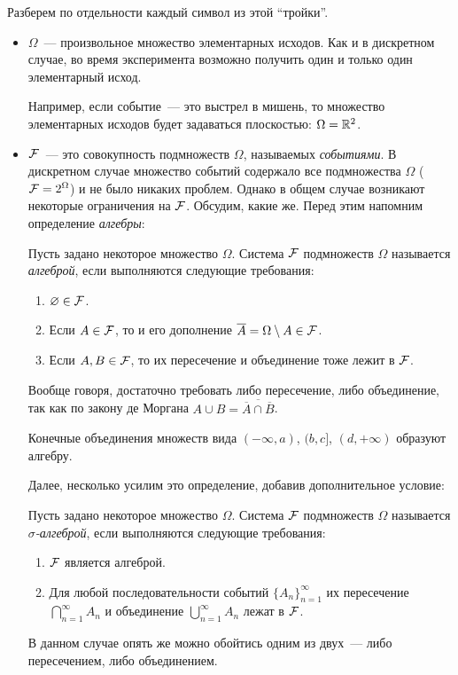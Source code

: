 Разберем по отдельности каждый символ из этой ``тройки''.
\begin{itemize}
	\item \(\Omega\)~--- произвольное множество элементарных исходов. Как и в дискретном случае, во время эксперимента возможно получить один и только один элементарный исход.
	
	Например, если событие~--- это выстрел в мишень, то множество элементарных исходов будет задаваться плоскостью: \(\Omega = \mathbb{R}^2\).
	
	\item \(\mathcal{F}\)~--- это совокупность подмножеств \(\Omega\), называемых \emph{событиями}. В дискретном случае множество событий содержало все подмножества \(\Omega\) (\(\mathcal{F} = 2^{\Omega}\)) и не было никаких проблем. Однако в общем случае возникают некоторые ограничения на \(\mathcal{F}\). Обсудим, какие же. Перед этим напомним определение \emph{алгебры}:
	\begin{definition}
		Пусть задано некоторое множество \(\Omega\). Система \(\mathcal{F}\) подмножеств \(\Omega\) называется \emph{алгеброй}, если выполняются следующие требования:
		\begin{enumerate}
			\item \(\varnothing \in \mathcal{F}\).
			\item Если \(A \in \mathcal{F}\), то и его дополнение \(\overline{A} = \Omega \setminus A \in \mathcal{F}\).
			\item Если \(A, B \in \mathcal{F}\), то их пересечение и объединение тоже лежит в \(\mathcal{F}\).
		\end{enumerate}
	\end{definition}
	Вообще говоря, достаточно требовать либо пересечение, либо объединение, так как по закону де Моргана \(A \cup B = \overline{\overline{A} \cap \overline{B}}\).
	\begin{example}
		Конечные объединения множеств вида \((-\infty, a)\), \((b, c]\), \((d, +\infty)\) образуют алгебру.
	\end{example}
	Далее, несколько усилим это определение, добавив дополнительное условие:
	\begin{definition}
		Пусть задано некоторое множество \(\Omega\). Система \(\mathcal{F}\) подмножеств \(\Omega\) называется \emph{\(\sigma\)-алгеброй}, если выполняются следующие требования:
		\begin{enumerate}
			\item \(\mathcal{F}\) является алгеброй.
			\item Для любой последовательности событий \(\{A_n\}_{n = 1}^{\infty}\) их пересечение \(\bigcap_{n = 1}^{\infty} A_n\) и объединение \(\bigcup_{n = 1}^{\infty} A_n\) лежат в \(\mathcal{F}\).
		\end{enumerate}
	\end{definition}
	В данном случае опять же можно обойтись одним из двух~--- либо пересечением, либо объединением.
	

\end{itemize}
